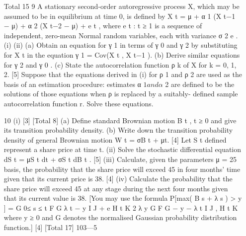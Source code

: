 \documentclass[a4paper,12pt]{article}
\begin{document}

\begin{enumerate}
\item 
[Total 15]9
A stationary second-order autoregressive process X, which may be assumed to
be in equilibrium at time 0, is defined by
X t = μ + α 1 (X t−1 − μ) + α 2 (X t−2 − μ) + e t ,
where {e t : t ≥ 1} is a sequence of independent, zero-mean Normal random
variables, each with variance σ 2 e .
(i)
(ii)
(a) Obtain an equation for γ 1 in terms of γ 0 and γ 2 by substituting for
X t in the equation γ 1 = Cov(X t , X t−1 ).
(b) Derive similar equations for γ 2 and γ 0 .
(c) State the autocorrelation function ρ k of X for k = 0, 1, 2.
[5]
Suppose that the equations derived in (i) for ρ 1 and ρ 2 are used as the
basis of an estimation procedure: estimates α $ 1 and α $ 2 are defined to be
the solutions of those equations when ρ is replaced by a suitably-
defined sample autocorrelation function r.
Solve these equations.

10
(i)
[3]
[Total 8]
(a) Define standard Brownian motion B t , t ≥ 0 and give its transition
probability density.
(b) Write down the transition probability density of general
Brownian motion W t = σB t + μt.
[4]
Let S t defined represent a share price at time t.
(ii)
Solve the stochastic differential equation
dS t = μS t dt + σS t dB t .
[5]
(iii) Calculate, given the parameters μ = 25%
basis, the probability that the share price will exceed 45 in four months’
time given that its current price is 38.
[4]
(iv) Calculate the probability that the share price will exceed 45 at any
stage during the next four months given that its current value is 38.
[You may use the formula
P[max( B s + λ s ) > y ] = G
0≤ s ≤ t
F G λ t − y I J + e
H t K
2 λ y
G
F G − y − λ t I J ,
H t K
where y ≥ 0 and G denotes the normalised Gaussian probability
distribution function.]
[4]
[Total 17]
103—5



\end{enumerate}
\end{document}
